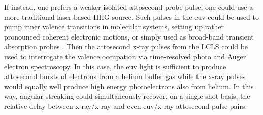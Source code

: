 If instead, one prefers a weaker isolated attosecond probe pulse, one could use a more traditional laser-based HHG source.
Such pulses in the euv could be used to pump inner valence transitions in molecular systems, setting up rather pronounced coherent electronic motions, or simply used as broad-band transient absorption probes \cite{Biegert2016}.
Then the attosecond x-ray pulses from the LCLS could be used to interrogate the valence occupation via time-resolved photo and Auger electron spectroscopy.
In this case, the euv light is sufficient to produce attosecond bursts of electrons from a helium buffer gas while the x-ray pulses would equally well produce high energy photoelectrons also from helium.
In this way, angular streaking could simultaneously recover, on a single shot basis, the relative delay between x-ray/x-ray and even euv/x-ray attosecond pulse pairs.

